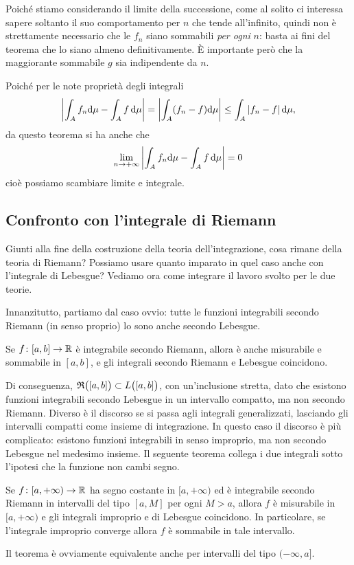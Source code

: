 Poich\'e stiamo considerando il limite della successione, come al solito ci interessa sapere soltanto il suo comportamento per $n$ che tende all'infinito, quindi non è strettamente necessario che le $f_n$ siano sommabili \emph{per ogni} $n$: basta ai fini del teorema che lo siano almeno definitivamente.
È importante però che la maggiorante sommabile $g$ sia indipendente da $n$.
\begin{osservazione} \label{o:convergenza-dominata}
	Poich\'e per le note proprietà degli integrali
	\begin{equation*}
		\left|{\int_Af_n\textup{d}\mu-\int_Af\,\textup{d}\mu}\right|=\left|{\int_A(f_n-f)\textup{d}\mu}\right|\leq\int_A\left|{f_n-f}\right|\textup{d}\mu,
	\end{equation*}
	da questo teorema si ha anche che
	\begin{equation}
		\lim_{n\to+\infty}\left|{\int_Af_n\textup{d}\mu-\int_Af\,\textup{d}\mu}\right|=0
	\end{equation}
	cioè possiamo scambiare limite e integrale.
\end{osservazione}

\subsection*{Confronto con l'integrale di Riemann}
Giunti alla fine della costruzione della teoria dell'integrazione, cosa rimane della teoria di Riemann?
Possiamo usare quanto imparato in quel caso anche con l'integrale di Lebesgue?
Vediamo ora come integrare il lavoro svolto per le due teorie. %

Innanzitutto, partiamo dal caso ovvio: tutte le funzioni integrabili secondo Riemann (in senso proprio) lo sono anche secondo Lebesgue.
\begin{teorema} \label{t:integrale-riemann-lebesgue}
	Se $f\colon[a,b]\to\mathbb{R}$ è integrabile secondo Riemann, allora è anche misurabile e sommabile in $[a,b]$, e gli integrali secondo Riemann e Lebesgue coincidono.
\end{teorema}
Di conseguenza, $\mathfrak{R}\big([a,b]\big)\subset L\big([a,b]\big)$, con un'inclusione stretta, dato che esistono funzioni integrabili secondo Lebesgue in un intervallo compatto, ma non secondo Riemann.
Diverso è il discorso se si passa agli integrali generalizzati, lasciando gli intervalli compatti come insieme di integrazione.
In questo caso il discorso è più complicato: esistono funzioni integrabili in senso improprio, ma non secondo Lebesgue nel medesimo insieme.
Il seguente teorema collega i due integrali sotto l'ipotesi che la funzione non cambi segno.
\begin{teorema} \label{t:integrale-improprio-lebesgue}
	Se $f\colon[a,+\infty)\to\mathbb{R}$ ha segno costante in $[a,+\infty)$ ed è integrabile secondo Riemann in intervalli del tipo $[a,M]$ per ogni $M>a$, allora $f$ è misurabile in $[a,+\infty)$ e gli integrali improprio e di Lebesgue coincidono.
	In particolare, se l'integrale improprio converge allora $f$ è sommabile in tale intervallo.
\end{teorema}
Il teorema è ovviamente equivalente anche per intervalli del tipo $(-\infty,a]$.

